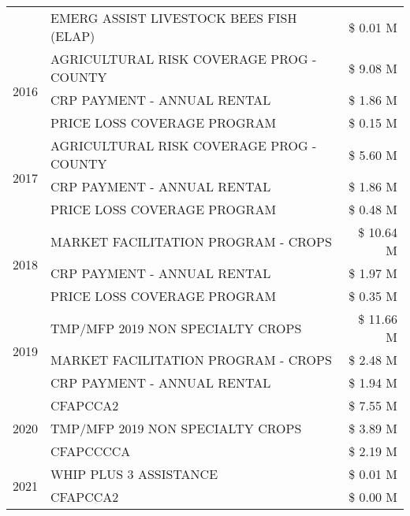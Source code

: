 \begin{tabular}{llr}
 & EMERG ASSIST LIVESTOCK BEES FISH (ELAP) & \$ 0.01 M \\
\cline{1-3}
\multirow[t]{3}{*}{2016} & AGRICULTURAL RISK COVERAGE PROG - COUNTY      & \$ 9.08 M \\
 & CRP PAYMENT - ANNUAL RENTAL                   & \$ 1.86 M \\
 & PRICE LOSS COVERAGE PROGRAM                   & \$ 0.15 M \\
\cline{1-3}
\multirow[t]{3}{*}{2017} & AGRICULTURAL RISK COVERAGE PROG - COUNTY & \$ 5.60 M \\
 & CRP PAYMENT - ANNUAL RENTAL & \$ 1.86 M \\
 & PRICE LOSS COVERAGE PROGRAM & \$ 0.48 M \\
\cline{1-3}
\multirow[t]{3}{*}{2018} & MARKET FACILITATION PROGRAM - CROPS & \$ 10.64 M \\
 & CRP PAYMENT - ANNUAL RENTAL & \$ 1.97 M \\
 & PRICE LOSS COVERAGE PROGRAM & \$ 0.35 M \\
\cline{1-3}
\multirow[t]{3}{*}{2019} & TMP/MFP 2019 NON SPECIALTY CROPS & \$ 11.66 M \\
 & MARKET FACILITATION PROGRAM - CROPS & \$ 2.48 M \\
 & CRP PAYMENT - ANNUAL RENTAL & \$ 1.94 M \\
\cline{1-3}
\multirow[t]{3}{*}{2020} & CFAPCCA2 & \$ 7.55 M \\
 & TMP/MFP 2019 NON SPECIALTY CROPS & \$ 3.89 M \\
 & CFAPCCCCA & \$ 2.19 M \\
\cline{1-3}
\multirow[t]{2}{*}{2021} & WHIP PLUS 3 ASSISTANCE & \$ 0.01 M \\
 & CFAPCCA2 & \$ 0.00 M \\
\cline{1-3}
\bottomrule
\end{tabular}
